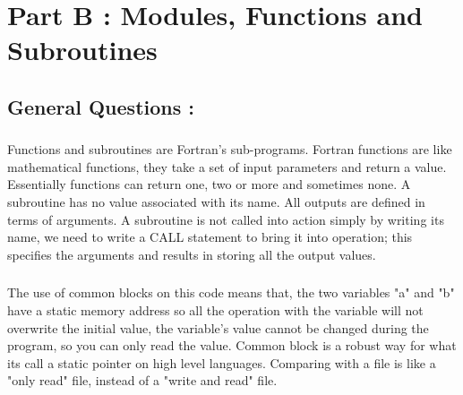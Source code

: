 \documentclass[twocolumn]{article}
\begin{document}
\section{Part B : Modules, Functions and Subroutines}

\subsection{General Questions : }

\subsubsection{}
\paragraph*{}

Functions and subroutines are Fortran’s sub-programs.
Fortran functions are like mathematical functions, they take a set of input parameters and return a value.
Essentially functions can return one, two or more and sometimes none.
A subroutine has no value associated with its name. All outputs are defined in terms of arguments.
A subroutine is not called into action simply by writing its name, we need to write a CALL statement to bring it into operation; this specifies the arguments and results in storing all the output values.

\subsubsection{}
\paragraph*{}
 The use of common blocks on this code means that, the two variables "a" and "b" have a static memory address so all the operation with the variable will not overwrite the initial value, the variable's value cannot be changed during the program, so you can only read the value. Common block is a robust way for what its call a static pointer on high level languages.
 Comparing with a file is like a "only read" file, instead of a "write and read" file.
\subsubsection{}
\end{document}
